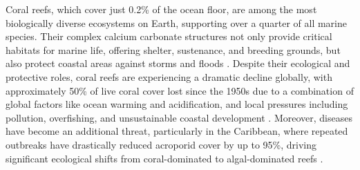 \documentclass[preprint,12pt,authoryear]{elsarticle}
\begin{document}
Coral reefs, which cover just 0.2\% of the ocean floor, are among the most biologically diverse ecosystems on Earth, supporting over a quarter of all marine species. Their complex calcium carbonate structures not only provide critical habitats for marine life, offering shelter, sustenance, and breeding grounds, but also protect coastal areas against storms and floods \citep{Moberg1999, Spalding1997, Rogers2014May, Ferrario2014, Elliff2017Jun}. Despite their ecological and protective roles, coral reefs are experiencing a dramatic decline globally, with approximately 50\% of live coral cover lost since the 1950s due to a combination of global factors like ocean warming and acidification, and local pressures including pollution, overfishing, and unsustainable coastal development \citep{Eddy2021Sep}. Moreover, diseases have become an additional threat, particularly in the Caribbean, where repeated outbreaks have drastically reduced acroporid cover by up to 95\%, driving significant ecological shifts from coral-dominated to algal-dominated reefs \citep{richardson1998coral, sutherland2004disease, aronson2001white, harvell2007coral, brandt2009dynamics}.
\end{document}
